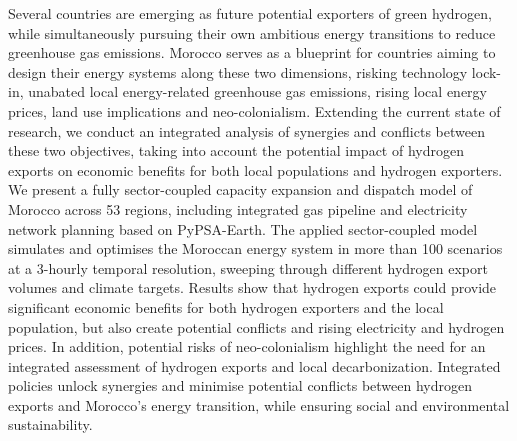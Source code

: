 Several countries are emerging as future potential exporters of green hydrogen, while simultaneously pursuing their own ambitious energy transitions to reduce greenhouse gas emissions. 
Morocco serves as a blueprint for countries aiming to design their energy systems along these two dimensions, risking technology lock-in, unabated local energy-related greenhouse gas emissions, rising local energy prices, land use implications and neo-colonialism. 
Extending the current state of research, we conduct an integrated analysis of synergies and conflicts between these two objectives, taking into account the potential impact of hydrogen exports on economic benefits for both local populations and hydrogen exporters. We present a fully sector-coupled capacity expansion and dispatch model of Morocco across 53 regions, including integrated gas pipeline and electricity network planning based on PyPSA-Earth. The applied sector-coupled model simulates and optimises the Moroccan energy system in more than 100 scenarios at a 3-hourly temporal resolution, sweeping through different hydrogen export volumes and climate targets. 
Results show that hydrogen exports could provide significant economic benefits for both hydrogen exporters and the local population, but also create potential conflicts and rising electricity and hydrogen prices.
In addition, potential risks of neo-colonialism highlight the need for an integrated assessment of hydrogen exports and local decarbonization. Integrated policies unlock synergies and minimise potential conflicts between hydrogen exports and Morocco's energy transition, while ensuring social and environmental sustainability.